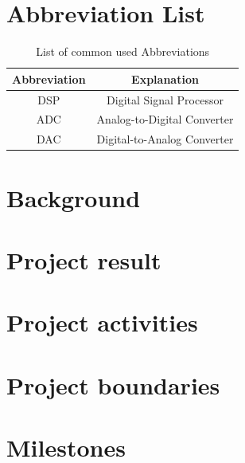 \documentclass[11pt, a4paper]{report}
\begin{document}
\begin{justify}


\newpage
\tableofcontents
\thispagestyle{empty}

\listoffigures
\thispagestyle{empty}

\listoftables
\thispagestyle{empty}

\newpage
\pagestyle{plain}
\setcounter{page}{1}

\chapter*{Abbreviation List}

\begin{table}[!h]
	\centering
\begin{tabular}{|c|c|}
	\hline
\textbf{Abbreviation} & \textbf{Explanation}        \\ \hline
DSP                   & Digital Signal Processor    \\ \hline
ADC                   & Analog-to-Digital Converter \\ \hline
DAC                   & Digital-to-Analog Converter \\ \hline
\end{tabular}
\caption{List of common used Abbreviations}
\label{Abbreviation list}
\end{table}

\chapter{Background}
	
	
\chapter{Project result}
	
	
\chapter{Project activities}
	

\chapter{Project boundaries}
	
	
\chapter{Milestones}
	


\end{justify}
\end{document}
